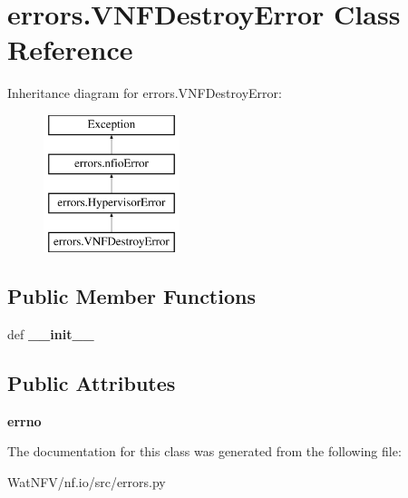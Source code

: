 \hypertarget{classerrors_1_1VNFDestroyError}{\section{errors.\-V\-N\-F\-Destroy\-Error Class Reference}
\label{classerrors_1_1VNFDestroyError}
}
Inheritance diagram for errors.\-V\-N\-F\-Destroy\-Error\-:\begin{figure}[H]
\begin{center}
\leavevmode
\includegraphics[height=4.000000cm]{classerrors_1_1VNFDestroyError}
\end{center}
\end{figure}
\subsection*{Public Member Functions}
\begin{DoxyCompactItemize}
\item 
\hypertarget{classerrors_1_1VNFDestroyError_a182be047d0ee59430d28c283377b25c0}{def {\bfseries \-\_\-\-\_\-init\-\_\-\-\_\-}}\label{classerrors_1_1VNFDestroyError_a182be047d0ee59430d28c283377b25c0}

\end{DoxyCompactItemize}
\subsection*{Public Attributes}
\begin{DoxyCompactItemize}
\item 
\hypertarget{classerrors_1_1VNFDestroyError_a370037b1906ac4230497a9f4f32160db}{{\bfseries errno}}\label{classerrors_1_1VNFDestroyError_a370037b1906ac4230497a9f4f32160db}

\end{DoxyCompactItemize}


The documentation for this class was generated from the following file\-:\begin{DoxyCompactItemize}
\item 
Wat\-N\-F\-V/nf.\-io/src/errors.\-py\end{DoxyCompactItemize}
